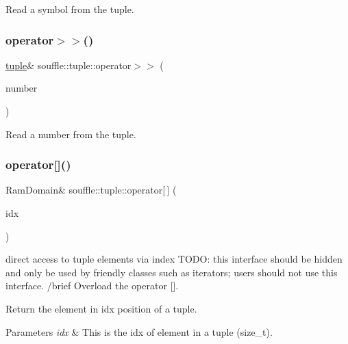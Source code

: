 Read a symbol from the tuple. \mbox{\label{classsouffle_1_1tuple_a8a244b8c41ed48f9bb88db305d4b8785}} 
\subsubsection{\texorpdfstring{operator$>$$>$()}{operator>>()}\hspace{0.1cm}{\footnotesize\ttfamily [2/2]}}
{\footnotesize\ttfamily \hyperlink{classsouffle_1_1tuple}{tuple}\& souffle\+::tuple\+::operator$>$$>$ (\begin{DoxyParamCaption}\item[{Ram\+Domain \&}]{number }\end{DoxyParamCaption})\hspace{0.3cm}{\ttfamily [inline]}}

Read a number from the tuple. \mbox{\label{classsouffle_1_1tuple_aa7ff0d718dbabaa6eab90a1b7615210a}} 
\subsubsection{\texorpdfstring{operator[]()}{operator[]()}\hspace{0.1cm}{\footnotesize\ttfamily [1/2]}}
{\footnotesize\ttfamily Ram\+Domain\& souffle\+::tuple\+::operator\mbox{[}$\,$\mbox{]} (\begin{DoxyParamCaption}\item[{size\+\_\+t}]{idx }\end{DoxyParamCaption})\hspace{0.3cm}{\ttfamily [inline]}}

direct access to tuple elements via index T\+O\+DO\+: this interface should be hidden and only be used by friendly classes such as iterators; users should not use this interface. /brief Overload the operator \mbox{[}\mbox{]}.

Return the element in idx position of a tuple. 
\begin{DoxyParams}{Parameters}
{\em idx} & This is the idx of element in a tuple (size\+\_\+t). \\
\hline
\end{DoxyParams}
\mbox{\label{classsouffle_1_1tuple_aab1b4561489c7cf69de57d90487119e6}} 
